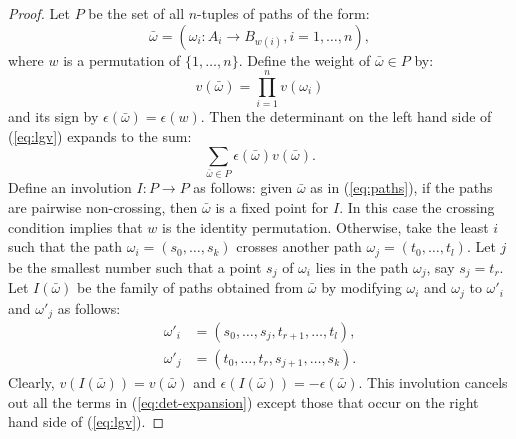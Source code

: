 \documentclass[11pt]{amsart}
\theoremstyle{definition}
\theoremstyle{example}
\begin{document}
\begin{proof}
  Let $P$ be the set of all $n$-tuples of paths of the form:
  \begin{equation}
    \label{eq:paths}
    \bar\omega = (\omega_i:A_i\to B_{w(i)}, i=1,\dotsc, n),
  \end{equation}
  where $w$ is a permutation of $\{1,\dotsc, n\}$.
  Define the weight of $\bar \omega\in P$ by:
  \begin{displaymath}
    v(\bar\omega) = \prod_{i=1}^n v(\omega_i)
  \end{displaymath}
  and its sign by $\epsilon(\bar\omega)=\epsilon(w)$.
  Then the determinant on the left hand side of (\ref{eq:lgv}) expands to the sum:
  \begin{equation}
    \label{eq:det-expansion}
    \sum_{\bar\omega\in P} \epsilon(\bar\omega)v(\bar\omega).
  \end{equation}
  Define an involution $I:P\to P$ as follows: given $\bar\omega$ as in (\ref{eq:paths}), if the paths are pairwise non-crossing, then $\bar\omega$ is a fixed point for $I$.
  In this case the crossing condition implies that $w$ is the identity permutation.
  Otherwise, take the least $i$ such that the path $\omega_i=(s_0,\dotsc,s_k)$ crosses another path $\omega_j=(t_0,\dotsc,t_l)$.
  Let $j$ be the smallest number such that a point $s_j$ of $\omega_i$ lies in the path $\omega_j$, say $s_j=t_r$.
  Let $I(\bar\omega)$ be the family of paths obtained from $\bar\omega$ by modifying $\omega_i$ and $\omega_j$ to $\omega'_i$ and $\omega'_j$ as follows:
  \begin{align*}
    \omega'_i & = (s_0,\dotsc, s_j, t_{r+1}, \dotsc, t_l),\\
    \omega'_j & = (t_0,\dotsc, t_r, s_{j+1}, \dotsc, s_k).
  \end{align*}
  Clearly, $v(I(\bar\omega)) = v(\bar\omega)$ and $\epsilon(I(\bar\omega)) = - \epsilon(\bar\omega)$.
  This involution cancels out all the terms in (\ref{eq:det-expansion}) except those that occur on the right hand side of (\ref{eq:lgv}).
\end{proof}
\end{document}

